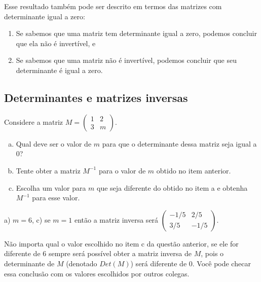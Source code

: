 \documentclass[main.tex]{subfiles}
\begin{document}
Esse resultado também pode ser descrito em termos das matrizes com determinante igual a zero:

\begin{enumerate}
 \item Se sabemos que uma matriz tem determinante igual a zero, podemos concluir que ela não é invertível, e
 \item Se sabemos que uma matriz não é invertível, podemos concluir que seu determinante é igual a zero.
\end{enumerate}

\subsection*{Determinantes e matrizes inversas}

\begin{questao}
Considere a matriz $M=\begin{pmatrix}1 & 2 \\ 3 & m\end{pmatrix}$.
\begin{enumerate}[a)]
\item Qual deve ser o valor de $m$ para que o determinante dessa matriz seja igual a 0?
\item Tente obter a matriz $M^{-1}$ para o valor de $m$ obtido no item anterior.
\item Escolha um valor para $m$ que seja diferente do obtido no item a e obtenha $M^{-1}$ para esse valor.
\end{enumerate}
\end{questao}

\begin{gabarito}
	\begin{gabaritoQuestao}
		a) $m=6$, c) se $m=1$ então a matriz inversa será $\begin{pmatrix} -1/5 & 2/5 \\ 3/5 & -1/5 \end{pmatrix}$.
	\end{gabaritoQuestao}
\end{gabarito}

Não importa qual o valor escolhido no item c da questão anterior, se ele for diferente de 6 sempre será possível obter a matriz inversa de $M$, pois o determinante de $M$ (denotado $Det(M)$) será diferente de 0. Você pode checar essa conclusão com os valores escolhidos por outros colegas.
\end{document}
